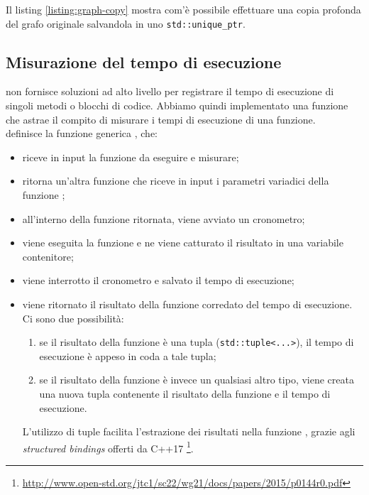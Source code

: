  \noindent Il listing \ref{listing:graph-copy} mostra com'è possibile effettuare una copia profonda del grafo originale salvandola in uno \texttt{std::unique_ptr}.

\subsection{Misurazione del tempo di esecuzione}
\label{sub:stopwatch}

\noindent {} non fornisce soluzioni ad alto livello per registrare il tempo di esecuzione di singoli metodi o blocchi di codice. Abbiamo quindi implementato una funzione  che astrae il compito di misurare i tempi di esecuzione di una funzione. \\

\noindent {} definisce la
funzione generica , che:

\begin{itemize}
    \item riceve in input la funzione  da eseguire e
      misurare;
    \item ritorna un'altra funzione che riceve in input i parametri
      variadici  della funzione ;
    \item all'interno della funzione ritornata, viene avviato un
      cronometro;
    \item viene eseguita la funzione e ne viene catturato il risultato
      in una variabile contenitore;
    \item viene interrotto il cronometro e salvato il tempo di
      esecuzione;
    \item viene ritornato il risultato della funzione corredato del
      tempo di esecuzione. Ci sono due possibilità:
    \begin{enumerate}
        \item se il risultato della funzione è una tupla
          (\texttt{std::tuple<...>}), il tempo di esecuzione
          è appeso in coda a tale tupla;
        \item se il risultato della funzione è invece un
          qualsiasi altro tipo, viene creata una nuova tupla
          contenente il risultato della funzione e il tempo di
          esecuzione.
    \end{enumerate}

    \noindent L'utilizzo di tuple facilita l'estrazione dei risultati nella funzione , grazie agli \textit{structured bindings} offerti da C++17 \footnote{\url{http://www.open-std.org/jtc1/sc22/wg21/docs/papers/2015/p0144r0.pdf}}.
\end{itemize}

